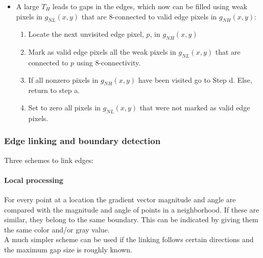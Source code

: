 \begin{enumerate}
\begin{itemize}
			\item A large $T_H$ leads to gaps in the edges, which now can be filled using weak pixels in $g_{NL}(x,y)$ that are 8-connected to valid edge pixels in $g_{NH}(x,y)$:
				\begin{enumerate}
					\item Locate the next unvisited edge pixel, $p$, in $g_{NH}(x,y)$
					\item Mark as valid edge pixels all the weak pixels in $g_{NL}(x,y)$ that are connected to $p$ using 8-connectivity.
					\item If all nonzero pixels in $g_{NH}(x,y)$ have been visited go to Step d. Else, return to step a.
					\item Set to zero all pixels in $g_{NL}(x,y)$ that were not marked as valid edge pixels.
				\end{enumerate}
		\end{itemize}
\end{enumerate}


\subsubsection{Edge linking and boundary detection}
Three schemes to link edges:\\
\paragraph{Local processing}
For every point at a location the gradient vector magnitude and angle are compared with the magnitude and angle of points in a neighborhood. If these are similar, they belong to the same boundary. This can be indicated by giving them the same color and/or gray value.\\
A much simpler scheme can be used if the linking follows certain directions and the maximum gap size is roughly known.\\

